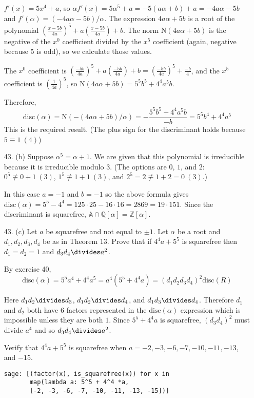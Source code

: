 \documentclass{article}
\newcommand{\Q}[0]{\mathbb{Q}}
\newcommand{\Z}[0]{\mathbb{Z}}
\newcommand{\norm}[1]{\text{N}(#1)}
\newcommand{\disc}[1]{\text{disc}(#1)}
\begin{document}
\begin{enumerate}
$f'(x) = 5x^4 + a$, so $\alpha f'(x) = 5\alpha^5 + a = -5(a\alpha + b) + a = -4a \alpha - 5b$ and $f'(\alpha) = (-4a\alpha - 5b) / \alpha$.  The expression $4a\alpha + 5b$ is a root of the polynomial $(\frac{x - 5b}{4a})^5 + a(\frac{x - 5b}{4a}) + b$.  The norm $\norm{4a\alpha + 5b}$ is the negative of the $x^0$ coefficient divided by the $x^5$ coefficient (again, negative because 5 is odd), so we calculate those values.

The $x^0$ coefficient is $(\frac{-5b}{4a})^5 + a(\frac{-5b}{4a}) + b = (\frac{-5b}{4a})^5 + \frac{-b}{4}$, and the $x^5$ coefficient is $(\frac{1}{4a})^5$, so $\norm{4a\alpha + 5b} = 5^5 b^5 + 4^4 a^5 b$.

Therefore, \[ \disc{\alpha} = \norm{-(4a\alpha + 5b)/\alpha} = -\frac{5^5 b^5 + 4^4 a^5 b}{-b} = 5^5 b^4 + 4^4 a^5 \]  This is the required result.  (The plus sign for the discriminant holds because $5 \equiv 1\ (4)$)

\item [43. (b)] Suppose $\alpha^5 = \alpha + 1$.  We are given that this polynomial is irreducible because it is irreducible modulo 3.  (The options are $0$, $1$, and $2$: $0^5 \not\equiv 0 + 1\ (3)$, $1^5 \not\equiv 1 + 1\ (3)$, and $2^5 = 2 \not\equiv 1 + 2 = 0\ (3)$.)

In this case $a = -1$ and $b = -1$ so the above formula gives $\disc{\alpha} = 5^5 - 4^4 = 125 \cdot 25 - 16 \cdot 16 = 2869 = 19 \cdot 151$.  Since the discriminant is squarefree, $\mathbb{A} \cap \Q[\alpha] = \Z[\alpha]$.

\item[43. (c)] Let $a$ be squarefree and not equal to $\pm 1$.  Let $\alpha$ be a root and $d_1, d_2, d_3, d_4$ be as in Theorem 13.  Prove that if $4^4 a + 5^5$ is squarefree then $d_1 = d_2 = 1$ and $d_3 d_4 \divides a^2$.

By exercise 40, \[ \disc{\alpha} = 5^5 a^4 + 4^4 a^5 = a^4(5^5 + 4^4 a) =(d_1 d_2 d_3 d_4)^2 \disc{R} \]

Here $d_1 d_2 \divides d_3$, $d_1 d_2 \divides d_4$, and $d_1 d_3 \divides d_4$.  Therefore $d_1$ and $d_2$ both have 6 factors represented in the $\disc{\alpha}$ expression which is impossible unless they are both $1$.  Since $5^5 + 4^4 a$ is squarefree, $(d_3 d_4)^2$ must divide $a^4$ and so $d_3 d_4 \divides a^2$.

Verify that $4^4 a + 5^5$ is squarefree when $a = -2, -3, -6, -7, -10, -11, -13$, and $-15$.

\begin{verbatim}
sage: [(factor(x), is_squarefree(x)) for x in
       map(lambda a: 5^5 + 4^4 *a,
       [-2, -3, -6, -7, -10, -11, -13, -15])]


\end{verbatim}
\end{enumerate}
\end{document}
